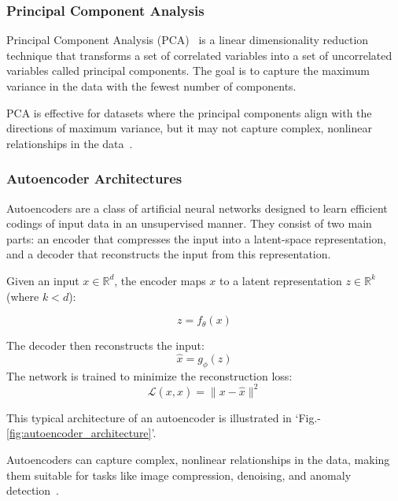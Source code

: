 \documentclass[conference]{IEEEtran}
\begin{document}
\subsubsection{Principal Component Analysis}
Principal Component Analysis (PCA)~\cite{shlensTutorialPrincipalComponent2014} is a linear dimensionality 
reduction technique that transforms a set of correlated 
variables into a set of uncorrelated variables called 
principal components. The goal is to capture the maximum 
variance in the data with the fewest number of components.

PCA is effective for datasets where the principal components 
align with the directions of maximum variance, but it may not 
capture complex, nonlinear relationships in the data~\cite{jolliffePrincipalComponentAnalysis2016}.

\subsubsection{Autoencoder Architectures}
Autoencoders are a class of artificial neural networks 
designed to learn efficient codings of input data in an 
unsupervised manner. They consist of two main parts: an 
encoder that compresses the input into a latent-space 
representation, and a decoder that reconstructs the input 
from this representation.

Given an input \( x \in \mathbb{R}^d \), the encoder maps 
\( x \) to a latent representation \( z \in \mathbb{R}^k \) 
(where \( k < d \)):

\begin{equation}
    z = f_\theta(x)
\end{equation}

The decoder then reconstructs the input:
\begin{equation}
    \hat{x} = g_\phi(z)
\end{equation}
The network is trained to minimize the reconstruction loss:
\begin{equation}
    \mathcal{L}(x, \hat{x}) = \| x - \hat{x} \|^2
\end{equation}

This typical architecture of an autoencoder is illustrated in 
`Fig.-\ref{fig:autoencoder_architecture}'.



Autoencoders can capture complex, nonlinear 
relationships in the data, making them suitable for tasks 
like image compression, denoising, and anomaly 
detection~\cite{hintonReducingDimensionalityData2006, estevaGuideDeepLearning2019a}.
\end{document}
